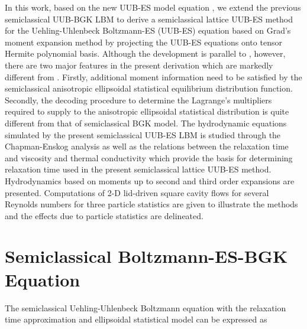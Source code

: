 \documentclass[doublecol]{epl2}
\begin{document}
In this work, based on the new UUB-ES model equation \cite{Wu2012}, we extend the previous semiclassical UUB-BGK LBM  \cite{Yang2009} to
derive a semiclassical lattice UUB-ES method for the Uehling-Uhlenbeck Boltzmann-ES (UUB-ES) equation based on Grad's moment expansion method by projecting the UUB-ES equations onto tensor Hermite polynomial basis.  Although the development is parallel to \cite{Yang2009}, however, there are two major features in the present derivation which are markedly different from \cite{Yang2009}. Firstly, additional moment information need to be satisfied by the  semiclassical anisotropic ellipsoidal statistical equilibrium distribution function. Secondly, the decoding procedure to determine the Lagrange's multipliers required to supply to the anisotropic ellipsoidal statistical distribution is quite different from that of semiclassical BGK model.  The hydrodynamic equations simulated by the present semiclassical UUB-ES LBM is studied through the Chapman-Enskog analysis as well as the relations between the relaxation time and viscosity and thermal conductivity which provide the basis for determining relaxation time used in the present semiclassical lattice UUB-ES method.  Hydrodynamics based on moments up to second and third order expansions are presented. Computations of 2-D lid-driven square cavity flows for several Reynolds numbers for three particle statistics are given to illustrate the methods and the effects due to particle statistics are delineated.

\section{Semiclassical Boltzmann-ES-BGK Equation}

The semiclassical Uehling-Uhlenbeck Boltzmann equation with the relaxation time approximation and ellipsoidal statistical model can be expressed as
\end{document}
